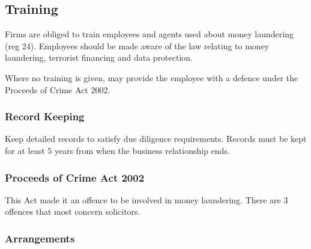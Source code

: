 \documentclass[
]{article}
\begin{document}
\hypertarget{training}{%
\subsection{Training}\label{training}}

Firms are obliged to train employees and agents used about money
laundering (reg 24). Employees should be made aware of the law relating
to money laundering, terrorist financing and data protection.

Where no training is given, may provide the employee with a defence
under the Proceeds of Crime Act 2002.

\hypertarget{record-keeping}{%
\subsubsection{Record Keeping}\label{record-keeping}}

Keep detailed records to satisfy due diligence requirements. Records
must be kept for at least 5 years from when the business relationship
ends.

\hypertarget{proceeds-of-crime-act-2002}{%
\subsubsection{Proceeds of Crime Act
2002}\label{proceeds-of-crime-act-2002}}

This Act made it an offence to be involved in money laundering. There
are 3 offences that most concern solicitors.

\hypertarget{arrangements}{%
\subsubsection{Arrangements}\label{arrangements}}
\end{document}

